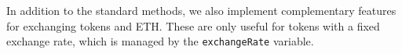 In addition to the standard \erc methods, we also implement complementary features for exchanging tokens and ETH. These are only useful for tokens with a fixed exchange rate, which is managed by the \texttt{exchangeRate} variable.

%

